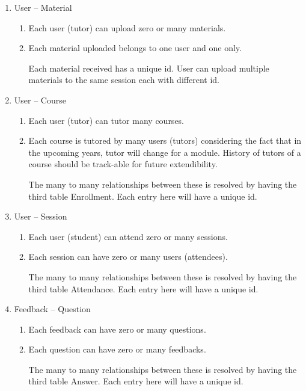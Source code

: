 \begin{justify}
\begin{enumerate}
    \item User -- Material
        \begin{enumerate}[itemsep=-0.3cm]
            \item Each user (tutor) can upload zero or many materials.
            \item Each material uploaded belongs to one user and one only.

            \newendline Each material received has a unique id. User can upload multiple materials to the same session each with different id.
        \end{enumerate}

    \item User -- Course
        \begin{enumerate}
            \item Each user (tutor) can tutor many courses.
            \item Each course is tutored by many users (tutors) considering the fact that in the upcoming years, tutor will change for a module. History of tutors of a course should be track-able for future extendibility.

            \newendline The many to many relationships between these is resolved by having the third table Enrollment. Each entry here will have a unique id.
        \end{enumerate}
        
    \item User -- Session
        \begin{enumerate}
            \item Each user (student) can attend zero or many sessions.
            \item Each session can have zero or many users (attendees).

            \newendline The many to many relationships between these is resolved by having the third table Attendance. Each entry here will have a unique id.
        \end{enumerate}

    \item Feedback -- Question
        \begin{enumerate}
            \item Each feedback can have zero or many questions.
            \item Each question can have zero or many feedbacks.

            \newendline The many to many relationships between these is resolved by having the third table Answer. Each entry here will have a unique id.
        \end{enumerate}


\end{enumerate}
\end{justify}
